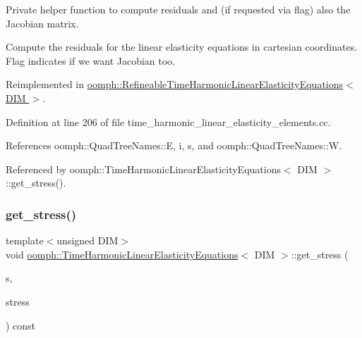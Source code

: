 Private helper function to compute residuals and (if requested via flag) also the Jacobian matrix. 

Compute the residuals for the linear elasticity equations in cartesian coordinates. Flag indicates if we want Jacobian too. 

Reimplemented in \hyperlink{classoomph_1_1RefineableTimeHarmonicLinearElasticityEquations_aee2ee5553f02fbb360115bf2e389b8b1}{oomph\+::\+Refineable\+Time\+Harmonic\+Linear\+Elasticity\+Equations$<$ D\+I\+M $>$}.



Definition at line 206 of file time\+\_\+harmonic\+\_\+linear\+\_\+elasticity\+\_\+elements.\+cc.



References oomph\+::\+Quad\+Tree\+Names\+::E, i, s, and oomph\+::\+Quad\+Tree\+Names\+::W.



Referenced by oomph\+::\+Time\+Harmonic\+Linear\+Elasticity\+Equations$<$ D\+I\+M $>$\+::get\+\_\+stress().

\mbox{\label{classoomph_1_1TimeHarmonicLinearElasticityEquations_a46807604989766db0dd54dd8ff457021}} 
\subsubsection{\texorpdfstring{get\+\_\+stress()}{get\_stress()}}
{\footnotesize\ttfamily template$<$unsigned D\+IM$>$ \\
void \hyperlink{classoomph_1_1TimeHarmonicLinearElasticityEquations}{oomph\+::\+Time\+Harmonic\+Linear\+Elasticity\+Equations}$<$ D\+IM $>$\+::get\+\_\+stress (\begin{DoxyParamCaption}\item[{const \hyperlink{classoomph_1_1Vector}{Vector}$<$ double $>$ \&}]{s,  }\item[{\hyperlink{classoomph_1_1DenseMatrix}{Dense\+Matrix}$<$ std\+::complex$<$ double $>$ $>$ \&}]{stress }\end{DoxyParamCaption}) const\hspace{0.3cm}{\ttfamily [virtual]}}



